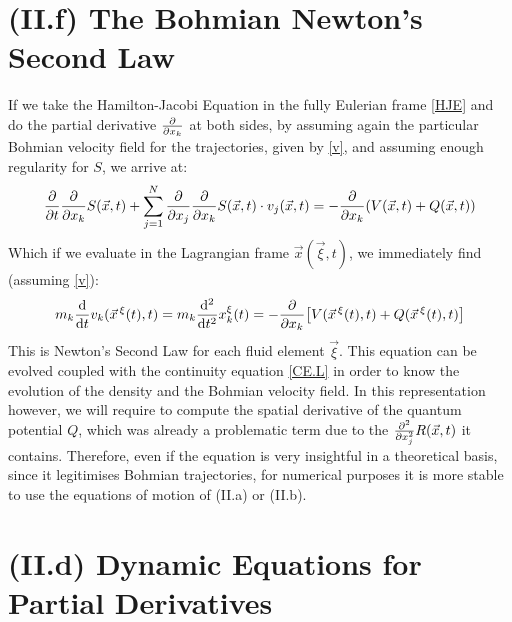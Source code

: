 \documentclass[11pt, a4paper]{article} %
\begin{document}
\section*{(II.f) The Bohmian Newton's Second Law}
If we take the Hamilton-Jacobi Equation in the fully Eulerian frame \eqref{HJE} and do the partial derivative $\pdv{}{x_k}$ at both sides, by assuming again the particular Bohmian velocity field for the trajectories, given by \eqref{v}, and assuming enough regularity for $S$, we arrive at:
\begin{equation}
\pdv{}{t}\pdv{}{x_k}S(\vec{x},t)+\sum_{j=1}^N\pdv{}{x_j}\pdv{}{x_k}S(\vec{x},t)\cdot v_j(\vec{x},t)=-\pdv{}{x_k}\qty(V(\vec{x},t)+Q(\vec{x},t))
\end{equation}
Which if we evaluate in the Lagrangian frame $\vec{x}(\vec{\xi},t)$, we immediately find (assuming \eqref{v}):
\begin{equation}
m_k\dv{}{t}v_k(\vec{x}^{\, \xi}(t),t)=m_k\dv[2]{}{t}x^\xi_k(t)=-\pdv{}{x_k}\qty[V(\vec{x}^{\, \xi}(t),t)+Q(\vec{x}^{\, \xi}(t),t) ]\vspace{-0.1cm}
\end{equation}
This is Newton's Second Law for each fluid element $\vec{\xi}$. This equation can be evolved coupled with the continuity equation \eqref{CE.L} in order to know the evolution of the density and the Bohmian velocity field. In this representation however, we will require to compute the spatial derivative of the quantum potential $Q$, which was already a problematic term due to the $\pdv[2]{}{x_j}R(\vec{x},t)$ it contains. Therefore, even if the equation is very insightful in a theoretical basis, since it legitimises Bohmian trajectories, for numerical purposes it is more stable to use the equations of motion of (II.a) or (II.b).\vspace{-0.2cm}


\section*{(II.d) Dynamic Equations for Partial Derivatives\vspace{-0.2cm}}
\end{document}
